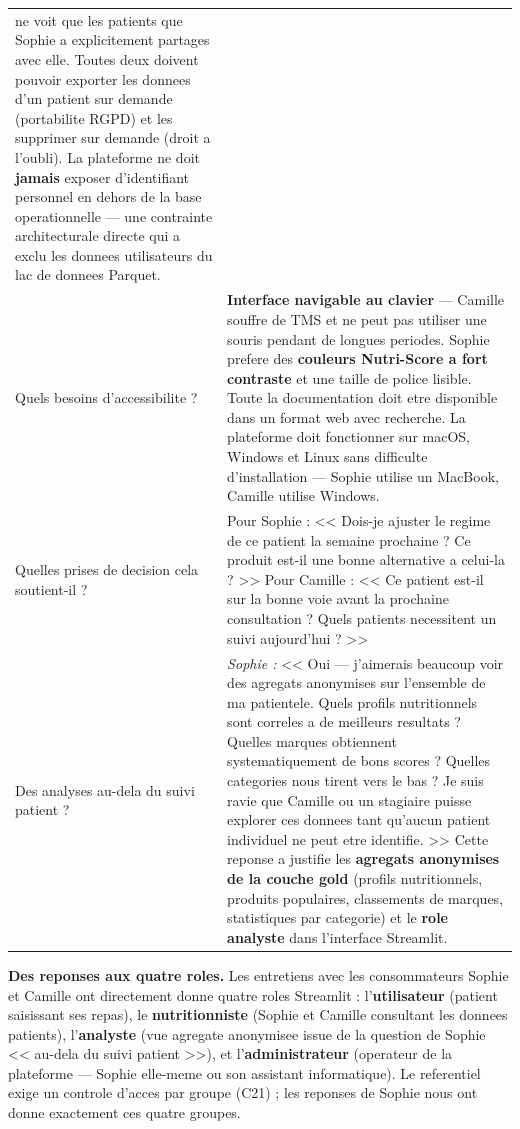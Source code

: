 \documentclass[a4paper,11pt,oneside,openany]{report}
\newcommand{\rgpd}{RGPD}
\begin{document}
\begin{table}[H]
\begin{tabularx}{\textwidth}{L{4cm} X}
ne voit que les patients que Sophie a explicitement partages avec elle.
Toutes deux doivent pouvoir exporter les donnees d'un patient sur
demande (portabilite \rgpd{}) et les supprimer sur demande (droit a
l'oubli). La plateforme ne doit \textbf{jamais} exposer d'identifiant
personnel en dehors de la base operationnelle --- une contrainte
architecturale directe qui a exclu les donnees utilisateurs du lac de
donnees Parquet.
\\
\addlinespace
Quels besoins d'accessibilite ? &
\textbf{Interface navigable au clavier} --- Camille souffre de TMS et
ne peut pas utiliser une souris pendant de longues periodes. Sophie
prefere des \textbf{couleurs Nutri-Score a fort contraste} et une
taille de police lisible. Toute la documentation doit etre disponible
dans un format web avec recherche. La plateforme doit fonctionner sur
macOS, Windows et Linux sans difficulte d'installation --- Sophie
utilise un MacBook, Camille utilise Windows.
\\
\addlinespace
Quelles prises de decision
cela soutient-il ? &
Pour Sophie : << Dois-je ajuster le regime de ce patient la semaine
prochaine ? Ce produit est-il une bonne alternative a celui-la ? >>
Pour Camille : << Ce patient est-il sur la bonne voie avant la
prochaine consultation ? Quels patients necessitent un suivi
aujourd'hui ? >>
\\
\addlinespace
Des analyses au-dela du
suivi patient ? &
\textit{Sophie :} << Oui --- j'aimerais beaucoup voir des agregats
anonymises sur l'ensemble de ma patientele. Quels profils
nutritionnels sont correles a de meilleurs resultats ? Quelles
marques obtiennent systematiquement de bons scores ? Quelles
categories nous tirent vers le bas ? Je suis ravie que Camille ou
un stagiaire puisse explorer ces donnees tant qu'aucun patient
individuel ne peut etre identifie. >>
Cette reponse a justifie les \textbf{agregats anonymises de la couche
gold} (profils nutritionnels, produits populaires, classements de
marques, statistiques par categorie) et le \textbf{role analyste}
dans l'interface Streamlit.
\\
\bottomrule
\end{tabularx}
\end{table}

\noindent\textbf{Des reponses aux quatre roles.} Les entretiens avec
les consommateurs Sophie et Camille ont directement donne quatre
roles Streamlit : l'\textbf{utilisateur} (patient saisissant ses
repas), le \textbf{nutritionniste} (Sophie et Camille consultant les
donnees patients), l'\textbf{analyste} (vue agregate anonymisee issue
de la question de Sophie << au-dela du suivi patient >>), et
l'\textbf{administrateur} (operateur de la plateforme --- Sophie
elle-meme ou son assistant informatique). Le referentiel exige un
controle d'acces par groupe (C21) ; les reponses de Sophie nous ont
donne exactement ces quatre groupes.
\end{document}
